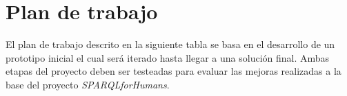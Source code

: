 \documentclass[conference,compsoc]{IEEEtran}
\begin{document}

    \section{Plan de trabajo}

El plan de trabajo descrito en la siguiente tabla se basa en el desarrollo de un
prototipo inicial el cual será iterado hasta llegar a una solución final. Ambas
etapas del proyecto deben ser testeadas para evaluar las mejoras realizadas a la
base del proyecto \textit{SPARQLforHumans}.
\end{document}
